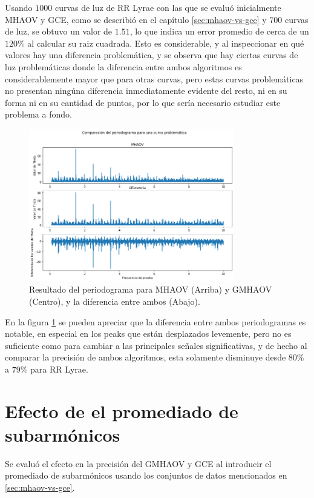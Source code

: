 Usando $1000$ curvas de luz de RR Lyrae con las que se evaluó inicialmente MHAOV y GCE, como se describió en el capítulo \ref{sec:mhaov-vs-gce} y $700$ curvas de luz, se obtuvo un valor de $1.51$, lo que indica un error promedio de cerca de un $120\%$ al calcular su raiz cuadrada. Esto es considerable, y al inspeccionar en qué valores hay una diferencia problemática, y se observa que hay ciertas curvas de luz problemáticas donde la diferencia entre ambos algoritmos es considerablemente mayor que para otras curvas, pero estas curvas problemáticas no presentan ningúna diferencia inmediatamente evidente del resto, ni en su forma ni en su cantidad de puntos, por lo que sería necesario estudiar este problema a fondo.

\begin{figure}[H]
    \centering
    \includegraphics[width=0.8\textwidth]{figs/problemas.png}
    \caption{Resultado del periodograma para MHAOV (Arriba) y GMHAOV (Centro), y la diferencia entre ambos (Abajo).}
    \label{fig:problemas}
\end{figure}
En la figura \ref{fig:problemas} se pueden apreciar que la diferencia entre ambos periodogramas es notable, en especial en los peaks que están desplazados levemente, pero no es suficiente como para cambiar a las principales señales significativas, y de hecho al comparar la precisión de ambos algoritmos, esta solamente disminuye desde $80\%$ a $79\%$ para RR Lyrae.
\section{Efecto de el promediado de subarmónicos}\label{sec:efectos-subarmonicos}

Se evaluó el efecto en la precisión del GMHAOV y GCE al introducir el promediado de subarmónicos usando los conjuntos de datos mencionados en \ref{sec:mhaov-vs-gce}. 
